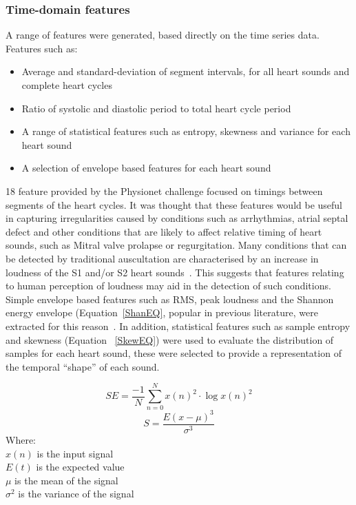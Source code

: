 \documentclass[titlepage, 12pt]{scrartcl} \usepackage{enumitem}
\begin{document}
\subsubsection{Time-domain features}\label{Time}
A range of features were generated, based directly on the time series data.
Features such as:
\begin{itemize}
    \item Average and standard-deviation of segment intervals, for all heart
        sounds and complete heart cycles
    \item Ratio of systolic and diastolic period to total heart cycle period
    \item A range of statistical features such as entropy, skewness and variance for
        each heart sound
    \item A selection of envelope based features for each heart sound
\end{itemize}

18 feature provided by the Physionet challenge focused on timings between
segments of the heart cycles. It was thought that these features would be
useful in capturing irregularities caused by conditions such as arrhythmias,
atrial septal defect and other conditions that are likely to affect relative
timing of heart sounds, such as Mitral valve prolapse or regurgitation.
Many conditions that can be detected by traditional auscultation are
characterised by an increase in loudness of the S1 and/or S2 heart
sounds~\parencite{Brown2008}. This suggests that features relating to human
perception of loudness may aid in the detection of such conditions.  Simple
envelope based features such as RMS, peak loudness and the Shannon energy
envelope (Equation~\ref{ShanEQ}, popular in previous literature, were extracted
for this reason~\parencite[p.73-77]{Lerch2012}. In addition, statistical
features such as sample entropy and skewness (Equation ~\ref{SkewEQ}) were used
to evaluate the distribution of samples for each heart sound, these were
selected to provide a representation of the temporal ``shape'' of each sound.

\begin{equation}\label{ShanEQ}
    SE = \frac{-1}{N}\sum\limits_{n=0}^N x(n)^2\cdot \log{x(n)^2}
\end{equation}
\begin{equation}\label{SkewEQ}
    S=\frac{E(x-\mu)^3}{\sigma^3}
\end{equation}
Where:\\
$x(n)$ is the input signal\\
$E(t)$ is the expected value\\
$\mu$ is the mean of the signal\\
$\sigma^2$ is the variance of the signal
\end{document}
